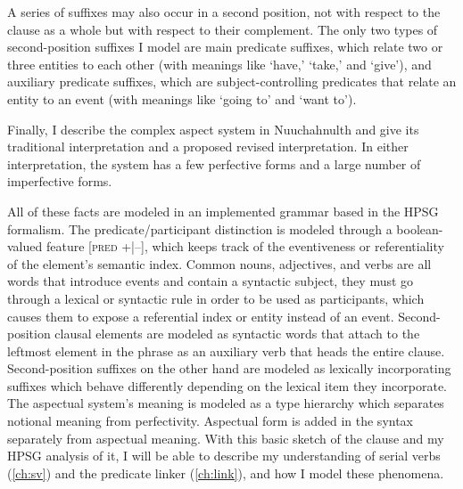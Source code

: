 A series of suffixes may also occur in a second position, not with respect to the clause as a whole but with respect to their complement. The only two types of second-position suffixes I model are main predicate suffixes, which relate two or three entities to each other (with meanings like `have,' `take,' and `give'), and auxiliary predicate suffixes, which are subject-controlling predicates that relate an entity to an event (with meanings like `going to' and `want to').

Finally, I describe the complex aspect system in Nuuchahnulth and give its traditional interpretation and a proposed revised interpretation. In either interpretation, the system has a few perfective forms and a large number of imperfective forms.

All of these facts are modeled in an implemented grammar based in the HPSG formalism. The predicate/participant distinction is modeled through a boolean-valued feature [\textsc{pred} +|--], which keeps track of the eventiveness or referentiality of the element's semantic index. Common nouns, adjectives, and verbs are all words that introduce events and contain a syntactic subject, they must go through a lexical or syntactic rule in order to be used as participants, which causes them to expose a referential index or entity instead of an event. Second-position clausal elements are modeled as syntactic words that attach to the leftmost element in the phrase as an auxiliary verb that heads the entire clause. Second-position suffixes on the other hand are modeled as lexically incorporating suffixes which behave differently depending on the lexical item they incorporate. The aspectual system's meaning is modeled as a type hierarchy which separates notional meaning from perfectivity. Aspectual form is added in the syntax separately from aspectual meaning. With this basic sketch of the clause and my HPSG analysis of it, I will be able to describe my understanding of serial verbs (\cref{ch:sv}) and the predicate linker (\cref{ch:link}), and how I model these phenomena.
